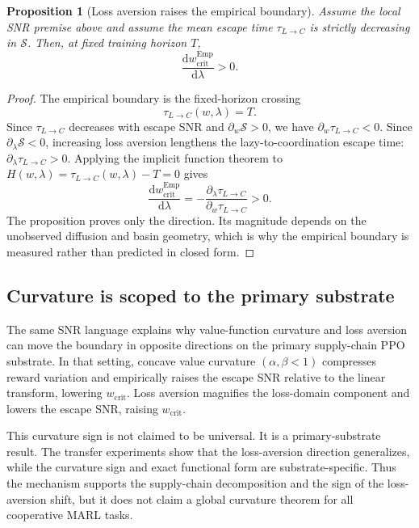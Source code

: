 \documentclass[letterpaper]{article} %
\theoremstyle{plain}
\newtheorem{proposition}{Proposition}
\newcommand{\wcrit}{w_{\mathrm{crit}}}
\begin{document}
\begin{proposition}[Loss aversion raises the empirical boundary]\label{thm:sign}
Assume the local SNR premise above and assume the mean escape time $\tau_{L\to C}$ is strictly
decreasing in $\mathcal{S}$. Then, at fixed training horizon $T$,
\begin{equation}
 \frac{\mathrm{d}\wcrit^{\mathrm{Emp}}}{\mathrm{d}\lambda}>0 .
\end{equation}
\end{proposition}
\begin{proof}
The empirical boundary is the fixed-horizon crossing
\begin{equation}
 \tau_{L\to C}(w,\lambda)=T .
\end{equation}
Since $\tau_{L\to C}$ decreases with escape SNR and $\partial_w\mathcal{S}>0$, we have
$\partial_w \tau_{L\to C}<0$. Since $\partial_\lambda\mathcal{S}<0$, increasing loss aversion
lengthens the lazy-to-coordination escape time: $\partial_\lambda \tau_{L\to C}>0$. Applying the
implicit function theorem to $H(w,\lambda)=\tau_{L\to C}(w,\lambda)-T=0$ gives
\begin{equation}
 \frac{\mathrm{d}\wcrit^{\mathrm{Emp}}}{\mathrm{d}\lambda}
 =
 -\frac{\partial_\lambda \tau_{L\to C}}
 {\partial_w \tau_{L\to C}}
 >0 .
\end{equation}
The proposition proves only the direction. Its magnitude depends on the unobserved diffusion and
basin geometry, which is why the empirical boundary is measured rather than predicted in closed
form.
\end{proof}

\subsection{Curvature is scoped to the primary substrate}
The same SNR language explains why value-function curvature and loss aversion can move the boundary
in opposite directions on the primary supply-chain PPO substrate. In that setting, concave value
curvature $(\alpha,\beta<1)$ compresses reward variation and empirically raises the escape SNR
relative to the linear transform, lowering $\wcrit$. Loss aversion magnifies the loss-domain
component and lowers the escape SNR, raising $\wcrit$.

This curvature sign is not claimed to be universal. It is a primary-substrate result. The transfer
experiments show that the loss-aversion direction generalizes, while the curvature sign and exact
functional form are substrate-specific. Thus the mechanism supports the supply-chain decomposition
and the sign of the loss-aversion shift, but it does not claim a global curvature theorem for all
cooperative MARL tasks.
\end{document}
